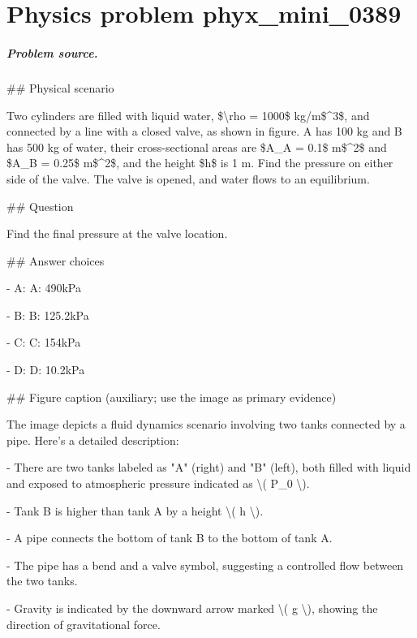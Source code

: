 
\chapter{Physics problem phyx\_mini\_0389}
\label{ch:PhyXMiniProblems_problem_phyx_mini_0389}

\paragraph{Problem source.}
\#\# Physical scenario

Two cylinders are filled with liquid water, \$\textbackslash{}rho = 1000\$ kg/m\$\textasciicircum{}3\$, and connected by a line with a closed valve, as shown in figure. A has 100 kg and B has 500 kg of water, their cross-sectional areas are \$A\_A = 0.1\$ m\$\textasciicircum{}2\$ and \$A\_B = 0.25\$ m\$\textasciicircum{}2\$, and the height \$h\$ is 1 m. Find the pressure on either side of the valve. The valve is opened, and water flows to an equilibrium.

\#\# Question

Find the final pressure at the valve location.

\#\# Answer choices

- A: A: 490kPa

- B: B: 125.2kPa

- C: C: 154kPa

- D: D: 10.2kPa

\#\# Figure caption (auxiliary; use the image as primary evidence)

The image depicts a fluid dynamics scenario involving two tanks connected by a pipe. Here's a detailed description:

- There are two tanks labeled as "A" (right) and "B" (left), both filled with liquid and exposed to atmospheric pressure indicated as \textbackslash{}( P\_0 \textbackslash{}).

- Tank B is higher than tank A by a height \textbackslash{}( h \textbackslash{}).

- A pipe connects the bottom of tank B to the bottom of tank A.

- The pipe has a bend and a valve symbol, suggesting a controlled flow between the two tanks.

- Gravity is indicated by the downward arrow marked \textbackslash{}( g \textbackslash{}), showing the direction of gravitational force.

